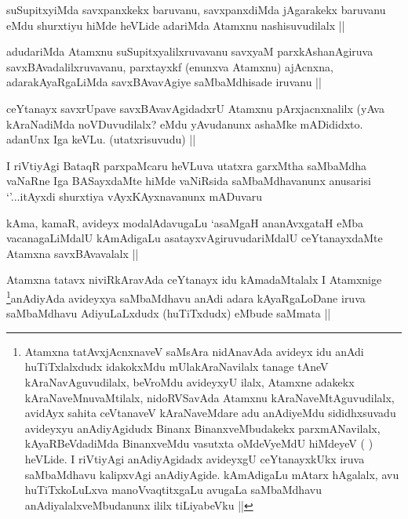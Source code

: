 \begin{artha}
suSupitxyiMda savxpanxkekx baruvanu, savxpanxdiMda jAgarakekx baruvanu eMdu shurxtiyu hiMde heVLide adariMda Atamxnu nashisuvudilalx ||
\end{artha}


\begin{artha}
adudariMda Atamxnu suSupitxyalilxruvavanu savxyaM parxkAshanAgiruva savxBAvadalilxruvavanu, parxtayxkf (enunxva Atamxnu) ajAcnxna, adarakAyaRgaLiMda savxBAvavAgiye saMbaMdhisade iruvanu ||
\end{artha}

\begin{artha}
ceYtanayx savxrUpave savxBAvavAgidadxrU Atamxnu pArxjacnxnalilx (yAva kAraNadiMda noVDuvudilalx? eMdu yAvudanunx ashaMke mADididxto. adanUnx Iga keVLu. (utatxrisuvudu) ||
\end{artha}

\begin{artha}
I riVtiyAgi BataqR parxpaMcaru heVLuva utatxra garxMtha saMbaMdha vaNaRne Iga BASayxdaMte hiMde vaNiRsida saMbaMdhavanunx anusarisi `\stext'...itAyxdi shurxtiya vAyxKAyxnavanunx mADuvaru
\end{artha}

\begin{artha}
kAma, kamaR, avideyx modalAdavugaLu `asaMgaH ananAvxgataH eMba vacanagaLiMdalU kAmAdigaLu asatayxvAgiruvudariMdalU ceYtanayxdaMte Atamxna savxBAvavalalx ||
\end{artha}

\begin{artha}
Atamxna tatavx niviRkAravAda ceYtanayx idu kAmadaMtalalx I Atamxnige \footnote{Atamxna tatAvxjAcnxnaveV saMsAra nidAnavAda avideyx idu anAdi huTiTxlalxdudx idakokxMdu mUlakAraNavilalx tanage tAneV kAraNavAguvudilalx, beVroMdu avideyxyU ilalx, Atamxne adakekx kAraNaveMnuvaMtilalx, nidoRVSavAda Atamxnu kAraNaveMtAguvudilalx, avidAyx sahita ceVtanaveV kAraNaveMdare adu anAdiyeMdu sididhxsuvadu avideyxyu anAdiyAgidudx Binanx BinanxveMbudakekx parxmANavilalx, kAyaRBeVdadiMda BinanxveMdu vasutxta oMdeVyeMdU hiMdeyeV ( ) heVLide. I riVtiyAgi anAdiyAgidadx avideyxgU ceYtanayxkUkx iruva saMbaMdhavu kalipxvAgi anAdiyAgide. kAmAdigaLu mAtarx hAgalalx, avu huTiTxkoLuLxva manoVvaqtitxgaLu avugaLa saMbaMdhavu anAdiyalalxveMbudanunx ililx tiLiyabeVku ||}anAdiyAda avideyxya saMbaMdhavu anAdi adara kAyaRgaLoDane iruva saMbaMdhavu AdiyuLaLxdudx (huTiTxdudx) eMbude saMmata ||
\end{artha}

